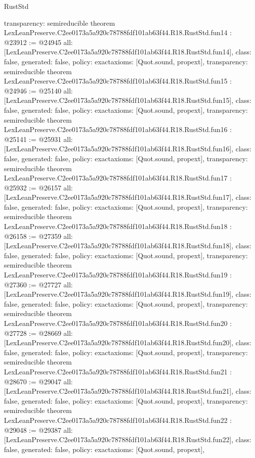 \begin{lexlean}{RustStd}
\begin{coremodule}
{  transparency: semireducible
}
theorem LexLeanPreserve.C2ee0173a5a920c78788fdf101ab63f44.R18.RustStd.fun14 : @23912 := @24945 {
  all: [LexLeanPreserve.C2ee0173a5a920c78788fdf101ab63f44.R18.RustStd.fun14],
  class: false,
  generated: false,
  policy: exact{axioms: [Quot.sound, propext]},
  transparency: semireducible
}
theorem LexLeanPreserve.C2ee0173a5a920c78788fdf101ab63f44.R18.RustStd.fun15 : @24946 := @25140 {
  all: [LexLeanPreserve.C2ee0173a5a920c78788fdf101ab63f44.R18.RustStd.fun15],
  class: false,
  generated: false,
  policy: exact{axioms: [Quot.sound, propext]},
  transparency: semireducible
}
theorem LexLeanPreserve.C2ee0173a5a920c78788fdf101ab63f44.R18.RustStd.fun16 : @25141 := @25931 {
  all: [LexLeanPreserve.C2ee0173a5a920c78788fdf101ab63f44.R18.RustStd.fun16],
  class: false,
  generated: false,
  policy: exact{axioms: [Quot.sound, propext]},
  transparency: semireducible
}
theorem LexLeanPreserve.C2ee0173a5a920c78788fdf101ab63f44.R18.RustStd.fun17 : @25932 := @26157 {
  all: [LexLeanPreserve.C2ee0173a5a920c78788fdf101ab63f44.R18.RustStd.fun17],
  class: false,
  generated: false,
  policy: exact{axioms: [Quot.sound, propext]},
  transparency: semireducible
}
theorem LexLeanPreserve.C2ee0173a5a920c78788fdf101ab63f44.R18.RustStd.fun18 : @26158 := @27359 {
  all: [LexLeanPreserve.C2ee0173a5a920c78788fdf101ab63f44.R18.RustStd.fun18],
  class: false,
  generated: false,
  policy: exact{axioms: [Quot.sound, propext]},
  transparency: semireducible
}
theorem LexLeanPreserve.C2ee0173a5a920c78788fdf101ab63f44.R18.RustStd.fun19 : @27360 := @27727 {
  all: [LexLeanPreserve.C2ee0173a5a920c78788fdf101ab63f44.R18.RustStd.fun19],
  class: false,
  generated: false,
  policy: exact{axioms: [Quot.sound, propext]},
  transparency: semireducible
}
theorem LexLeanPreserve.C2ee0173a5a920c78788fdf101ab63f44.R18.RustStd.fun20 : @27728 := @28669 {
  all: [LexLeanPreserve.C2ee0173a5a920c78788fdf101ab63f44.R18.RustStd.fun20],
  class: false,
  generated: false,
  policy: exact{axioms: [Quot.sound, propext]},
  transparency: semireducible
}
theorem LexLeanPreserve.C2ee0173a5a920c78788fdf101ab63f44.R18.RustStd.fun21 : @28670 := @29047 {
  all: [LexLeanPreserve.C2ee0173a5a920c78788fdf101ab63f44.R18.RustStd.fun21],
  class: false,
  generated: false,
  policy: exact{axioms: [Quot.sound, propext]},
  transparency: semireducible
}
theorem LexLeanPreserve.C2ee0173a5a920c78788fdf101ab63f44.R18.RustStd.fun22 : @29048 := @29387 {
  all: [LexLeanPreserve.C2ee0173a5a920c78788fdf101ab63f44.R18.RustStd.fun22],
  class: false,
  generated: false,
  policy: exact{axioms: [Quot.sound, propext]},
}
\end{coremodule}
\end{lexlean}
